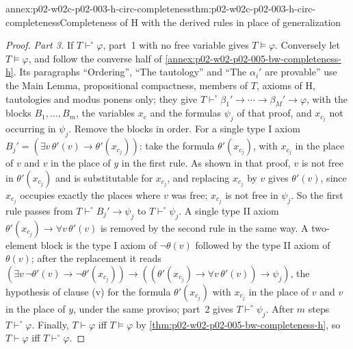 \begin{annexitem}{annex:p02-w02c-p02-003-h-circ-completeness}{thm:p02-w02c-p02-003-h-circ-completeness}{Completeness of H with the derived rules in place of generalization}
\begin{proof}
\emph{Part 3.}  If \(T\vdash^{\circ}\varphi\), part~1 with no free variable
gives \(T\models\varphi\).  Conversely let \(T\models\varphi\), and follow
the converse half of \cref{annex:p02-w02-p02-005-bw-completeness-h}.  Its
paragraphs ``Ordering'', ``The tautology'' and ``The \(\alpha_i'\) are
provable'' use the Main Lemma, propositional compactness, members of
\(T\), axioms of H, tautologies and modus ponens only; they give
\(T\vdash^{\circ}\beta_1'\to\cdots\to\beta_M'\to\varphi\), with the blocks
\(B_1,\ldots,B_m\), the variables \(x_c\) and the formulas \(\psi_j\) of
that proof, and \(x_{c_j}\) not occurring in \(\psi_j\).  Remove the blocks
in order.  For a single type I axiom \(B_j'=(\exists v\,\theta'(v)\to
\theta'(x_{c_j}))\): take the formula \(\theta'(x_{c_j})\), with
\(x_{c_j}\) in the place of \(v\) and \(v\) in the place of \(y\) in the
first rule.  As shown in that proof, \(v\) is not free in
\(\theta'(x_{c_j})\) and is substitutable for \(x_{c_j}\), and replacing
\(x_{c_j}\) by \(v\) gives \(\theta'(v)\), since \(x_{c_j}\) occupies
exactly the places where \(v\) was free; \(x_{c_j}\) is not free in
\(\psi_j\).  So the first rule passes from \(T\vdash^{\circ}B_j'\to\psi_j\)
to \(T\vdash^{\circ}\psi_j\).  A single type II axiom
\(\theta'(x_{c_j})\to\forall v\,\theta'(v)\) is removed by the second rule
in the same way.  A two-element block is the type I axiom of
\(\neg\theta(v)\) followed by the type II axiom of \(\theta(v)\); after the
replacement it reads
\((\exists v\,\neg\theta'(v)\to\neg\theta'(x_{c_j}))\to
((\theta'(x_{c_j})\to\forall v\,\theta'(v))\to\psi_j)\), the hypothesis of
clause (v) for the formula \(\theta'(x_{c_j})\) with \(x_{c_j}\) in the
place of \(v\) and \(v\) in the place of \(y\), under the same proviso;
part~2 gives \(T\vdash^{\circ}\psi_j\).  After \(m\) steps
\(T\vdash^{\circ}\varphi\).  Finally, \(T\vdash\varphi\) iff
\(T\models\varphi\) by \cref{thm:p02-w02-p02-005-bw-completeness-h}, so
\(T\vdash\varphi\) iff \(T\vdash^{\circ}\varphi\).
\end{proof}
\end{annexitem}

